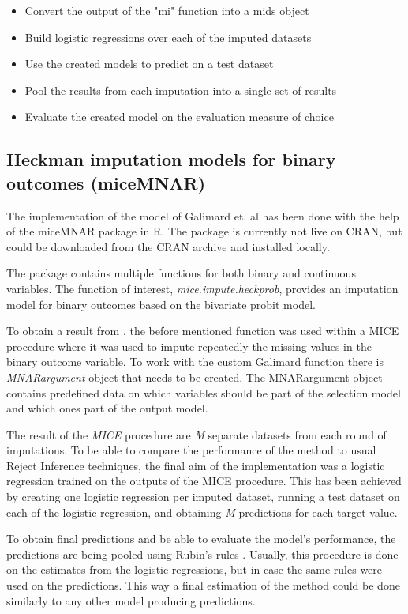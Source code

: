 \documentclass[11pt,a4paper]{article}
\begin{document}
\begin{itemize}
  \item Convert the output of the "mi" function into a mids object
  \item Build logistic regressions over each of the imputed datasets
  \item Use the created models to predict on a test dataset
  \item Pool the results from each imputation into a single set of results
  \item Evaluate the created model on the evaluation measure of choice
\end{itemize}


\subsection{Heckman imputation models for binary outcomes (miceMNAR)} \label{micemnar}

The implementation of the model of Galimard et. al \cite{galimard_heckman_2018} has been done with the help of the miceMNAR package in R. The package is currently not live on CRAN, but could be downloaded from the CRAN archive and installed locally. 

The package contains multiple functions for both binary and continuous variables. The function of interest, \textit{mice.impute.heckprob}, provides an imputation model for binary outcomes based on the bivariate probit model. 

To obtain a result from \cite{galimard_heckman_2018}, the before mentioned function was used within a MICE procedure where it was used to impute repeatedly the missing values in the binary outcome variable. To work with the custom Galimard function there is \textit{MNARargument} object that needs to be created. The MNARargument object contains predefined data on which variables should be part of the selection model and which ones part of the output model. 

The result of the \textit{MICE} procedure are \textit{M} separate datasets from each round of imputations. To be able to compare the performance of the method to usual Reject Inference techniques, the final aim of the implementation was a logistic regression trained on the outputs of the MICE procedure. This has been achieved by creating one logistic regression per imputed dataset, running a test dataset on each of the logistic regression, and obtaining \textit{M} predictions for each target value.

To obtain final predictions and be able to evaluate the model's performance, the predictions are being pooled using Rubin's rules \cite{rubin1987multiple}. Usually, this procedure is done on the estimates from the logistic regressions, but in case the same rules were used on the predictions. This way a final estimation of the method could be done similarly to any other model producing predictions. 
\end{document}
